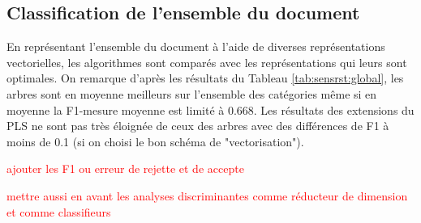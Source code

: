\subsection{Classification de l'ensemble du document}

En représentant l'ensemble du document à l'aide de diverses représentations vectorielles, les algorithmes sont comparés avec les représentations qui leurs sont optimales. On remarque d'après les résultats du Tableau \ref{tab:sensrst:global}, les arbres sont en moyenne meilleurs sur l'ensemble des catégories même si en moyenne la F1-mesure moyenne est limité à 0.668. Les résultats des extensions du PLS ne sont pas très éloignée de ceux des arbres avec des différences de F1 à moins de 0.1 (si on choisi le bon schéma de "vectorisation").

\begin{table}[!htb]	
	\tiny
	
	\textcolor{red}{ajouter les F1 ou erreur de rejette et de accepte}
	
	\textcolor{red}{mettre aussi en avant les analyses discriminantes comme réducteur de dimension et comme classifieurs}
	


\end{table}
